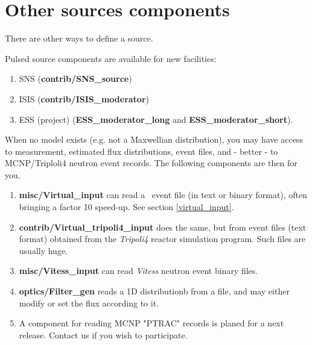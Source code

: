 \newpage


\newpage


\newpage


\newpage


\newpage


\newpage


\newpage


\newpage


\newpage
\section{Other sources components}
\label{sources-seealso}

There are other ways to define a source.

Pulsed source components are available for new facilities:
\begin{enumerate}
\item SNS ({\bf contrib/SNS\_source})
\item ISIS ({\bf contrib/ISIS\_moderator})
\item ESS (project) ({\bf ESS\_moderator\_long} and {\bf  ESS\_moderator\_short}).
\end{enumerate}

When no model exists (e.g. not a Maxwellian distribution), you may have access to measurement, estimated flux distributions, event files, and - better - to MCNP/Triploli4 neutron event records. The following components are then for you.

\begin{enumerate}
\item{{\bf misc/Virtual\_input} can read a \MCS\ event file (in text or binary format), often bringing a factor 10 speed-up. See section \ref{virtual_input}.}
\item{{\bf contrib/Virtual\_tripoli4\_input} does the same, but from event files (text format) obtained from the \emph{Tripoli4} \cite{tripoli_webpage} reactor simulation program. Such files are usually huge.}
\item{{\bf misc/Vitess\_input} can read \emph{Vitess} \cite{vitess_webpage} neutron event binary files.}
\item{{\bf optics/Filter\_gen} reads a 1D distributionb from a file, and may either modify or set the flux according to it.}
\item{A component for reading MCNP "PTRAC" records is planed for a next release. Contact us if you wish to participate.}
\end{enumerate}
